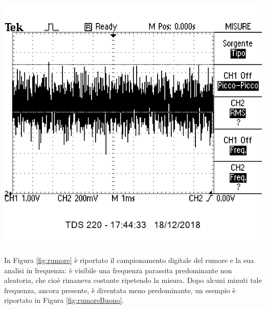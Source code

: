 \documentclass[10pt,oneside,a4paper]{article}
\newenvironment{Figure}
  {\par\medskip\noindent\minipage{\linewidth}}
  {\endminipage\par\medskip}
\begin{document}
\begin{multicols}{2}
\begin{Figure}
	\begin{center}
	\includegraphics[width=0.8\linewidth]{rumoreOsc}
	\label{fig:rumoreOsc}
	\end{center}
\end{Figure}

In Figura \ref{fig:rumore} è riportato il campionamento digitale del rumore e la sua analisi in frequenza: è visibile una frequenza parassita predominante non aleatoria, che cioè rimaneva costante ripetendo la misura. Dopo alcuni minuti tale frequenza, ancora presente, è diventata meno predominante, un esempio è riportato in Figura \ref{fig:rumoreBuono}.


\end{multicols}
\end{document}
